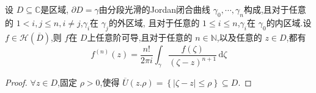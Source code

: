 \documentclass[../../复变函数.tex]{subfiles}
\begin{document}
\begin{theorem}
    设 \(  D\subseteq \mathbb{C}   \)是区域, \(   \partial D =   \gamma   \)由分段光滑的Jordan闭合曲线 \(   \gamma_0,\cdots,\gamma_{n}   \)构成,且对于任意的 \(  1< i,j\le n,i\neq j  \),\(   \gamma _{i}  \)在 \(   \gamma _{j}  \)的外区域,      且对于任意的 \(  1\le i\le n  \),\(   \gamma _{i}  \)在 \(   \gamma _0   \)的内区域.设 \(  f \in \mathcal{H}\left( \overline{D} \right)   \),则 \(  f  \)在 \(  D  \)上任意阶可导,且对于任意的 \(  n\in \mathbb{N}   \),以及任意的 \(  z \in D  \),都有 \[
    f^{\left( n \right) }\left( z \right)= \frac{n! }{2\pi i }\int_{ \gamma }\frac{f\left( \zeta  \right)  }{\left( \zeta -z \right)^{n+ 1}  }\,\mathrm{d} \zeta    
    \]        
\end{theorem}
\begin{proof}
    \(  \forall z \in D  \),固定 \(  \rho > 0  \),使得 \(  \overline{U}\left( z.\rho  \right)= \left\{ \left| \zeta -z \right|\le \rho   \right\}   \subseteq D\).
    

\end{proof}
\end{document}
